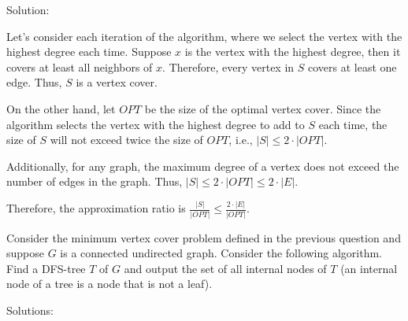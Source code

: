 \documentclass{oxmathproblems}
\begin{document}
\begin{questions}
Solution:

Let's consider each iteration of the algorithm, where we select the vertex with the highest degree each time. Suppose $x$ is the vertex with the highest degree, then it covers at least all neighbors of $x$. Therefore, every vertex in $S$ covers at least one edge. Thus, $S$ is a vertex cover.

On the other hand, let $OPT$ be the size of the optimal vertex cover. Since the algorithm selects the vertex with the highest degree to add to $S$ each time, the size of $S$ will not exceed twice the size of $OPT$, i.e., $|S| \leq 2 \cdot |OPT|$.

Additionally, for any graph, the maximum degree of a vertex does not exceed the number of edges in the graph. Thus, $|S| \leq 2 \cdot |OPT| \leq 2 \cdot |E|$.

Therefore, the approximation ratio is $\frac{|S|}{|OPT|} \leq \frac{2 \cdot |E|}{|OPT|}$.


\miquestion[25]
Consider the minimum vertex cover problem defined in the previous question and suppose $G$ is a connected undirected graph.
Consider the following algorithm.
Find a DFS-tree $T$ of $G$ and output the set of all internal nodes of $T$ (an internal node of a tree is a node that is not a leaf).

Solutions:
\end{questions}
\end{document}
